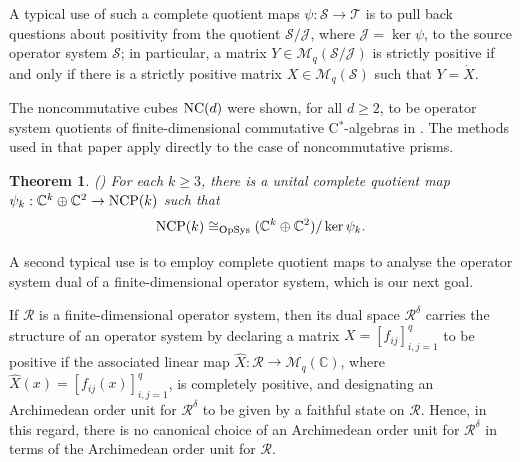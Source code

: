 \documentclass{amsart}
\newtheorem{theorem}{Theorem}[section]
\theoremstyle{definition}
\theoremstyle{remark}
\newcommand{\M}{\mathcal{M}}
\newcommand\osr{{\mathcal R}}
\newcommand\oss{{\mathcal S}}
\newcommand\ost{{\mathcal T}}
\newcommand{\jay}{\mathcal{J}}                   %
\numberwithin{equation}{section}
\begin{document}
A typical use of such a complete quotient maps $\psi:\oss\rightarrow\ost$ is to pull back questions about positivity from the quotient $\oss/\jay$, where
$\jay=\ker\psi$,
to the source operator system $\oss$; in particular,
a matrix $Y\in \M_q(\oss/\jay)$ is strictly positive if and only if there is a strictly positive matrix $X\in \M_q(\oss)$
such that $Y=\dot{X}$.

The noncommutative cubes $\mbox{\textrm{NC}}(d)$ were shown, for all $d\geq2$, 
to be operator system quotients of finite-dimensional commutative C$^*$-algebras
in \cite[\S5]{farenick--kavruk--paulsen--todorov2018}. The methods used in that paper apply directly to the case of  
noncommutative prisms.  

\begin{theorem}\label{quo-thm}{\textrm (\cite[Corollary 5.3]{farenick--kavruk--paulsen--todorov2018})}
For each $k\geq 3$, there is a unital complete quotient map $\psi_{k}:\mathbb C^k \oplus \mathbb C^2 \rightarrow \mbox{\textrm{NCP}}(k)$ such that
\[
\mbox{\textrm{NCP}}(k) \cong_{\textrm{OpSys}} (\mathbb C^k \oplus \mathbb C^2) / \ker\psi_k .
\]
\end{theorem}

A second typical use is to employ complete quotient maps to analyse the operator system dual of a finite-dimensional operator system, which is our next goal.

If $\osr$ is a finite-dimensional operator system, then its dual space $\osr^\delta$ 
carries the structure of an operator system \cite[Corollary 4.5]{choi--effros1977}
by declaring a matrix $X=[f_{ij}]_{i,j=1}^q$ to be positive if the associated linear 
map $\hat X:\osr\rightarrow\M_q(\mathbb C)$, where
$\hat X(x)=[f_{ij}(x)]_{i,j=1}^q$,
is completely positive, and designating an Archimedean order unit for $\osr^\delta$ to be given 
by a faithful state on $\osr$.  Hence, 
in this regard, there is no canonical choice of an Archimedean order unit for $\osr^\delta$ in terms of the Archimedean order unit for $\osr$.
\end{document}
